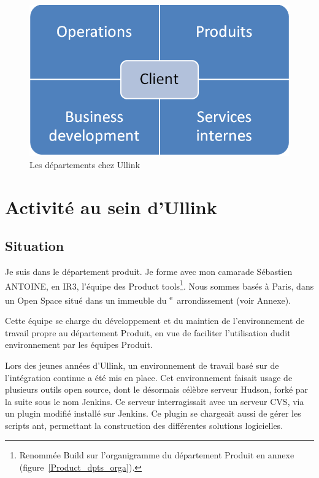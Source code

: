 \documentclass[a4paper, 12pt]{article}
\begin{document}
\begin{figure}
\includegraphics[width=\textwidth]{orga_deps_client.png}
\caption{Les départements chez Ullink}
\label{depts_ullink}
\end{figure}

\section{Activité au sein d'Ullink}

\subsection{Situation}

Je suis dans le département produit. Je forme avec mon camarade Sébastien ANTOINE, en IR3, l'équipe des Product tools\footnote{Renommée Build sur l'organigramme du département Produit en annexe (figure~\ref{Product_dpts_orga}).}. Nous sommes basés à Paris, dans un Open Space situé dans un immeuble du \textsc{}\textsuperscript{e}~arrondissement (voir Annexe).

Cette équipe se charge du développement et du maintien de l'environnement de travail propre au département Produit, en vue de faciliter l'utilisation dudit environnement par les équipes Produit.

Lors des jeunes années d'Ullink, un environnement de travail basé sur de l'intégration continue a été mis en place. Cet environnement faisait usage de plusieurs outils open source, dont le désormais célèbre serveur Hudson, forké par la suite sous le nom Jenkins. Ce serveur interragissait avec un serveur CVS, via un plugin modifié installé sur Jenkins. Ce plugin se chargeait aussi de gérer les scripts ant, permettant la construction des différentes solutions logicielles.
\end{document}
